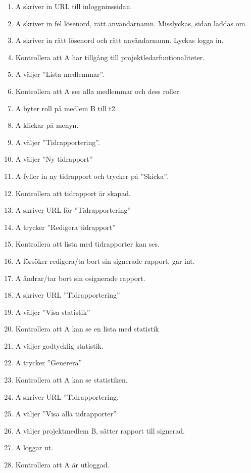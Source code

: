 \documentclass[a4paper]{article}
\begin{document}
\begin{ST}
\begin{enumerate}
\item A skriver in URL till inloggninssidan.
\item A skriver in fel lösenord, rätt användarnamn. Misslyckas, sidan laddas om.
\item A skriver in rätt lösenord och rätt användarnamn. Lyckas logga in.
\item Kontrollera att A har tillgång till projektledarfuntionaliteter.
\item A väljer ''Lista medlemmar''.
\item Kontrollera att A ser alla medlemmar och dess roller.
\item A byter roll på medlem B till t2.
\item A klickar på menyn.
\item A väljer ''Tidrapportering''.
\item A väljer ''Ny tidrapport''
\item A fyller in ny tidrapport och trycker på ''Skicka''.
\item Kontrollera att tidrapport är skapad.
\item A skriver URL för ''Tidrapportering''
\item A trycker ''Redigera tidrapport''
\item Kontrollera att lista med tidrapporter kan ses.
\item A försöker redigera/ta bort sin signerade rapport, går int.
\item A ändrar/tar bort sin osignerade rapport.
\item A skriver URL ''Tidrapportering''
\item A väljer ''Visa statistik''
\item Kontrollera att A kan se en lista med statistik
\item A väljer godtycklig statistik.
\item A trycker ''Generera''
\item Kontrollera att A kan se statistiken.
\item A skriver URL ''Tidrapportering.
\item A väljer ''Visa alla tidrapporter''
\item A väljer projektmedlem B, sätter rapport till signerad.
\item A loggar ut.
\item Kontrollera att A är utloggad.



\end{enumerate}

\end{ST}
\end{document}
